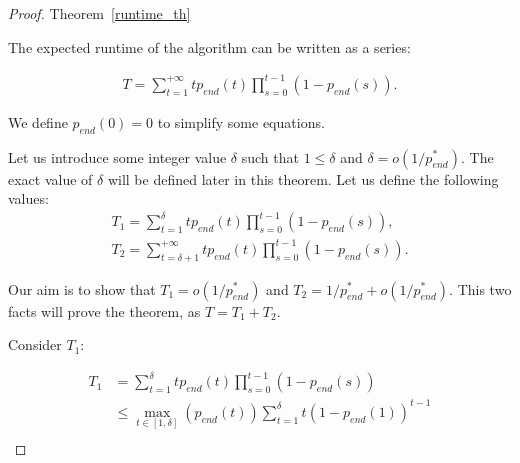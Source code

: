 \documentclass{article}
\begin{document}
\begin{proof}{Theorem~\ref{runtime_th}}

The expected runtime of the algorithm can be written as a series:

\begin{align*}
  T = \sum\limits_{t = 1}^{+\infty} t p_{end}(t) \prod\limits_{s = 0}^{t - 1} (1 - p_{end}(s)).
\end{align*}

We define $p_{end}(0) = 0$ to simplify some equations.

Let us introduce some integer value $\delta$ such that $1 \le \delta$ and $\delta = o(1/p_{end}^*)$. The exact value of $\delta$ will be defined later in this theorem. Let us define the following values:
\begin{align*}
  T_1 = \sum\limits_{t = 1}^{\delta} t p_{end}(t) \prod\limits_{s = 0}^{t - 1} (1 - p_{end}(s)), \\
  T_2 = \sum\limits_{t = \delta + 1}^{+\infty} t p_{end}(t) \prod\limits_{s = 0}^{t - 1} (1 - p_{end}(s)).
\end{align*}

Our aim is to show that $T_1 = o(1/p_{end}^*)$ and $T_2 = 1/p_{end}^* + o(1/p_{end}^*).$ This two facts will prove the theorem, as $T = T_1 + T_2$.

Consider $T_1$:

\begin{align*}
  T_1 &=  \sum\limits_{t = 1}^{\delta} t p_{end}(t) \prod\limits_{s = 0}^{t - 1} (1 - p_{end}(s)) \\
  &\le \max\limits_{t \in [1, \delta]}(p_{end}(t)) \sum\limits_{t = 1}^{\delta} t (1 - p_{end}(1))^{t - 1} \\
\end{align*}
\end{proof}

\printbibliography
\end{document}
